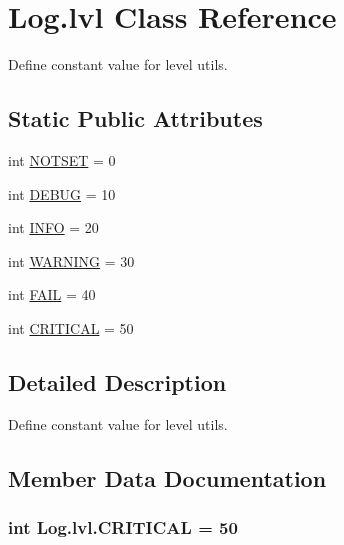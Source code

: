 \hypertarget{class_log_1_1lvl}{}\section{Log.\+lvl Class Reference}
\label{class_log_1_1lvl}


Define constant value for level utils.  


\subsection*{Static Public Attributes}
\begin{DoxyCompactItemize}
\item 
int \hyperlink{class_log_1_1lvl_a02d1cd2ef3bdac4d2f84facb74452685}{N\+O\+T\+S\+E\+T} = 0
\item 
int \hyperlink{class_log_1_1lvl_abbee3fe06a1896a4bd13d4901f0a892f}{D\+E\+B\+U\+G} = 10
\item 
int \hyperlink{class_log_1_1lvl_af306f6ac0ec77f65ca3a35592b148adb}{I\+N\+F\+O} = 20
\item 
int \hyperlink{class_log_1_1lvl_a453dc11d5d9bdccefd63d5794d9aee47}{W\+A\+R\+N\+I\+N\+G} = 30
\item 
int \hyperlink{class_log_1_1lvl_a9e0eb8280b2ca2279616b80933316159}{F\+A\+I\+L} = 40
\item 
int \hyperlink{class_log_1_1lvl_a3e4b3eb2fc27a260f2971f93758856f2}{C\+R\+I\+T\+I\+C\+A\+L} = 50
\end{DoxyCompactItemize}


\subsection{Detailed Description}
Define constant value for level utils. 

\subsection{Member Data Documentation}
\hypertarget{class_log_1_1lvl_a3e4b3eb2fc27a260f2971f93758856f2}{}
\subsubsection[{C\+R\+I\+T\+I\+C\+A\+L}]{\setlength{\rightskip}{0pt plus 5cm}int Log.\+lvl.\+C\+R\+I\+T\+I\+C\+A\+L = 50\hspace{0.3cm}{\ttfamily [static]}}\label{class_log_1_1lvl_a3e4b3eb2fc27a260f2971f93758856f2}
\hypertarget{class_log_1_1lvl_abbee3fe06a1896a4bd13d4901f0a892f}{}
